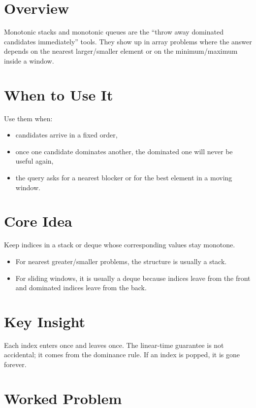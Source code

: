 \section*{Overview}

Monotonic stacks and monotonic queues are the ``throw away dominated candidates immediately'' tools. They show up in
array problems where the answer depends on the nearest larger/smaller element or on the minimum/maximum inside a window.

\section*{When to Use It}

Use them when:

\begin{itemize}
  \item candidates arrive in a fixed order,
  \item once one candidate dominates another, the dominated one will never be useful again,
  \item the query asks for a nearest blocker or for the best element in a moving window.
\end{itemize}

\section*{Core Idea}

Keep indices in a stack or deque whose corresponding values stay monotone.

\begin{itemize}
  \item For nearest greater/smaller problems, the structure is usually a stack.
  \item For sliding windows, it is usually a deque because indices leave from the front and dominated indices leave from
  the back.
\end{itemize}

\section*{Key Insight}

Each index enters once and leaves once. The linear-time guarantee is not accidental; it comes from the dominance rule.
If an index is popped, it is gone forever.

\section*{Worked Problem}


